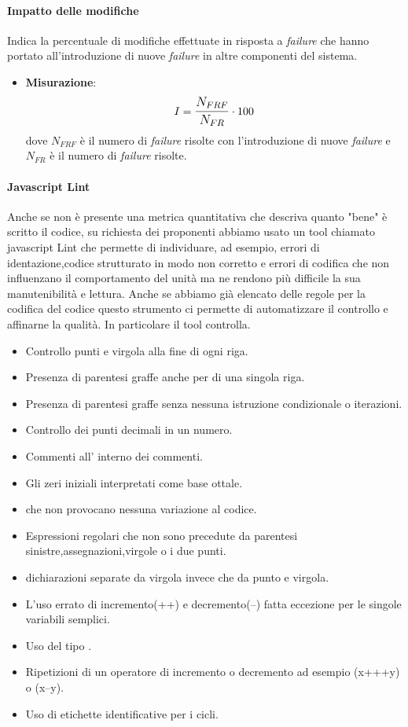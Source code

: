 \paragraph{Impatto delle modifiche}
Indica la percentuale di modifiche effettuate in risposta a \textit{failure} che hanno portato all'introduzione di nuove \textit{failure} in altre componenti del sistema.
\begin{itemize}
	\item \textbf{Misurazione}: 
		$$I=\mathlarger{\frac{N_{FRF}}{N_{FR}}} \cdot 100$$
	dove $N_{FRF}$ è il numero di \textit{failure} risolte con l'introduzione di nuove \textit{failure} e $N_{FR}$ è il numero di \textit{failure} risolte.
\end{itemize}


\paragraph{Javascript Lint}
Anche se non è presente una metrica quantitativa che descriva quanto "bene" è scritto il codice, su richiesta dei proponenti abbiamo usato un tool chiamato javascript Lint che permette di individuare, ad esempio, errori di identazione,codice strutturato in modo non corretto e errori di codifica che non influenzano il comportamento del unità ma ne rendono più difficile la sua manutenibilità e lettura.
Anche se abbiamo già elencato delle regole per la codifica del codice questo strumento ci permette di automatizzare il controllo e affinarne la qualità.
In particolare il tool  controlla.
\begin{itemize}
\item Controllo punti e virgola alla fine di ogni riga.
\item Presenza di parentesi graffe anche per  di una singola riga.
\item Presenza di parentesi graffe senza nessuna istruzione condizionale o iterazioni.
\item Controllo dei punti decimali in un numero.
\item Commenti all' interno dei commenti.
\item Gli zeri iniziali interpretati come base ottale. 
\item {} che non provocano nessuna variazione al codice.
\item Espressioni regolari che non sono precedute da parentesi sinistre,assegnazioni,virgole o i due punti.
\item dichiarazioni separate da virgola invece che da punto e virgola.
\item L'uso errato di incremento(++) e decremento(--) fatta eccezione per le singole variabili semplici.
\item Uso del tipo .
\item Ripetizioni di un operatore di incremento o decremento ad esempio (x+++y) o (x--y).
\item Uso di etichette identificative per i cicli.
\end{itemize}

